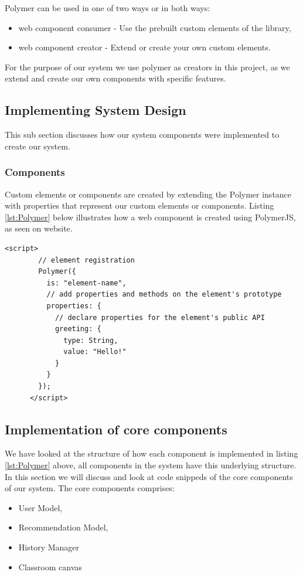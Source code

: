 Polymer can be used in one of two ways or in both ways: 
\begin{itemize}
    \item web component consumer - Use the prebuilt custom elements of the library, 
    \item web component creator - Extend or create your own custom elements.
\end{itemize}

For the purpose of our system we use polymer as creators in this project, as we extend and create our own components with specific features.

\subsection{Implementing System Design}
This sub section discusses how our system components were implemented to create our system.
\subsubsection{Components}
Custom elements or components are created by extending the Polymer instance with properties that represent our custom elements or components. Listing \ref{lst:Polymer} below illustrates how a web component is created using PolymerJS, as seen on \cite{website:PolymerJS} website.
\begin{lstlisting}[caption={Creating a web component with PolymerJS}, label={lst:Polymer}]
    <script>
        // element registration
        Polymer({
          is: "element-name",
          // add properties and methods on the element's prototype
          properties: {
            // declare properties for the element's public API
            greeting: {
              type: String,
              value: "Hello!"
            }
          }
        });
      </script>
\end{lstlisting}

\subsection{Implementation of core components}
We have looked at the structure of how each component is implemented in listing \ref{lst:Polymer} above, all components in the system have this underlying structure. In this section we will discuss and look at code snippeds of the core components of our system. The core components comprises: 
\begin{itemize}
    \item User Model,
    \item Recommendation Model,
    \item History Manager
    \item Classroom canvas      
\end{itemize}

